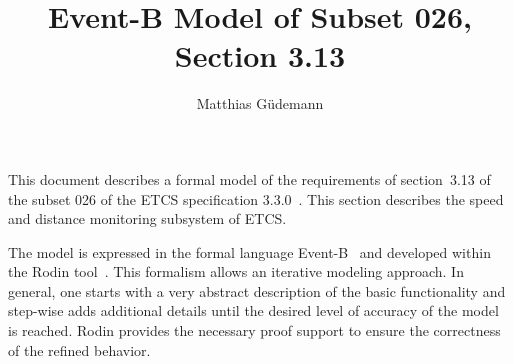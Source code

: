 \documentclass{template/openetcs_article}
\begin{document}
\frontmatter
{}





\newcommand{\true}{\ensuremath{true}}
\newcommand{\btext}[1]{{\it #1}}
\newcommand{\bvar}[1]{\btext{#1}}
\newcommand{\bevent}[1]{\btext{#1}}
\newcommand{\binv}[1]{\btext{#1}}
\newcommand{\bconst}[1]{\btext{#1}}
\newcommand{\bparam}[1]{\btext{#1}}
\newcommand{\bfunc}[1]{\btext{#1}}
\newcommand{\baxiom}[1]{\btext{#1}}
\newcommand{\btype}[1]{\btext{#1}}
\newcommand{\bguard}[1]{\btext{#1}}
\newcommand{\bmachine}[1]{\btext{#1}}
\newcommand{\bctx}[1]{\btext{#1}}

\author{Matthias Güdemann}


\title{Event-B Model of Subset 026, Section 3.13}




\maketitle
\tableofcontents
\listoffiguresandtables
\newpage

This document describes a formal model of the requirements of section~3.13 of
the subset 026 of the ETCS specification 3.3.0~\cite{SRS-026-330}. This section
describes the speed and distance monitoring subsystem of ETCS.

The model is expressed in the formal language Event-B~\cite{abrial-eventB-Book}
and developed within the Rodin tool~\cite{rodin-handbook}. This formalism allows
an iterative modeling approach. In general, one starts with a very abstract
description of the basic functionality and step-wise adds additional details
until the desired level of accuracy of the model is reached. Rodin provides the
necessary proof support to ensure the correctness of the refined behavior.
\end{document}
